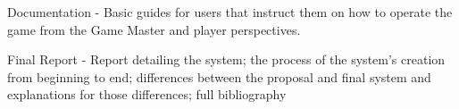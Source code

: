 \documentclass[11pt,fleqn,twoside]{article}
\begin{document}
Documentation - Basic guides for users that instruct them on how to operate the game from the Game Master and player perspectives.

Final Report - Report detailing the system; the process of the system's creation from beginning to end; differences between the proposal and final system and explanations for those differences; full bibliography


%
%


%
%


\nocite{*} %

\newpage
{}

%
%

\renewcommand{\refname}{Annotated Bibliography}  %
\end{document}
